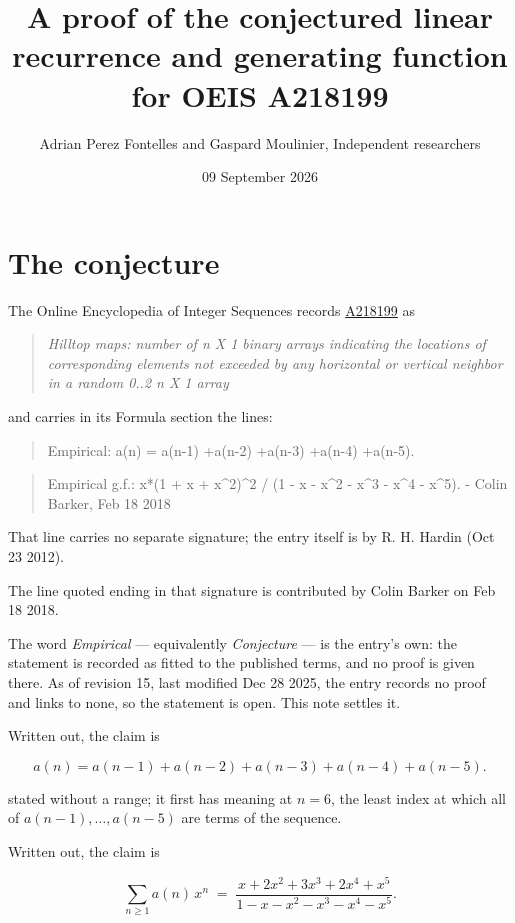 \documentclass[11pt]{article}
\title{A proof of the conjectured linear recurrence and generating function for OEIS A218199}
\author{Adrian Perez Fontelles and Gaspard Moulinier, Independent researchers}
\date{09 September 2026}
\theoremstyle{definition}
\begin{document}
\maketitle
\section{The conjecture}

The Online Encyclopedia of Integer Sequences records \href{https://oeis.org/A218199}{A218199} as

\begin{quote}\itshape Hilltop maps: number of n X 1 binary arrays indicating the locations of corresponding elements not exceeded by any horizontal or vertical neighbor in a random 0..2 n X 1 array\end{quote}

and carries in its Formula section the lines:

\begin{quote}\ttfamily Empirical: a(n) = a(n-1) +a(n-2) +a(n-3) +a(n-4) +a(n-5).\end{quote}

\begin{quote}\ttfamily Empirical g.f.: x*(1 + x + x\textasciicircum{}2)\textasciicircum{}2 / (1 - x - x\textasciicircum{}2 - x\textasciicircum{}3 - x\textasciicircum{}4 - x\textasciicircum{}5). - Colin Barker, Feb 18 2018\end{quote}

That line carries no separate signature; the entry itself is by R. H. Hardin (Oct 23 2012).

The line quoted ending in that signature is contributed by Colin Barker on Feb 18 2018.

The word {\itshape Empirical} --- equivalently {\itshape Conjecture} --- is the entry's own: the statement is recorded as fitted to the published terms, and no proof is given there. As of revision 15, last modified Dec 28 2025, the entry records no proof and links to none, so the statement is open. This note settles it.

Written out, the claim is

\[a(n) = a(n-1) + a(n-2) + a(n-3) + a(n-4) + a(n-5).\]

stated without a range; it first has meaning at $n = 6$, the least index at which all of $a(n-1),\dots,a(n-5)$ are terms of the sequence.

Written out, the claim is

\[\sum_{n \ge 1} a(n)\,x^n \;=\; \frac{x + 2x^{2} + 3x^{3} + 2x^{4} + x^{5}}{1 - x - x^{2} - x^{3} - x^{4} - x^{5}}.\]
\end{document}
